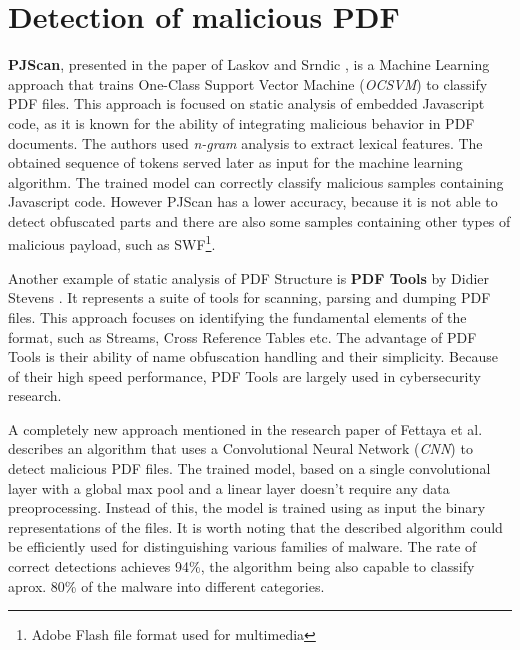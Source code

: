 

\section{Detection of malicious PDF}
\label{section:relatedWorkML}
\textbf{PJScan}, presented in the paper of Laskov and Srndic \cite{pjscan}, is a Machine Learning approach that trains One-Class Support Vector Machine (\textit{OCSVM}) to classify PDF files. This approach is focused on static analysis of embedded Javascript code, as it is known for the ability of integrating malicious behavior in PDF documents. The authors used \textit{n-gram} analysis to extract lexical features. The obtained sequence of tokens served later as input for the machine learning algorithm. The trained model can correctly classify malicious samples containing Javascript code. However PJScan has a lower accuracy, because it is not able to detect obfuscated parts and there are also some samples containing other types of malicious payload, such as SWF\footnote{Adobe Flash file format used for multimedia}. \par
Another example of static analysis of PDF Structure is \textbf{PDF Tools} by Didier Stevens \cite{pdftools}. It represents a suite of tools for scanning, parsing and dumping PDF files. This approach focuses on identifying the fundamental elements of the format, such as Streams, Cross Reference Tables etc. The advantage of PDF Tools is their ability of name obfuscation handling and their simplicity. Because of their high speed performance, PDF Tools are largely used in cybersecurity research. \par
A completely new approach mentioned in the research paper of Fettaya et al. \cite{deepdf} describes an algorithm that uses a Convolutional Neural Network (\textit{CNN}) to detect malicious PDF files. The trained model, based on a single convolutional layer with a global max pool and a linear layer doesn't require any data preoprocessing. Instead of this, the model is trained using as input the binary representations of the files. It is worth noting that the described algorithm could be efficiently used for distinguishing various families of malware. The rate of correct detections achieves 94\%, the algorithm being also capable to classify aprox. 80\% of the malware into different categories.